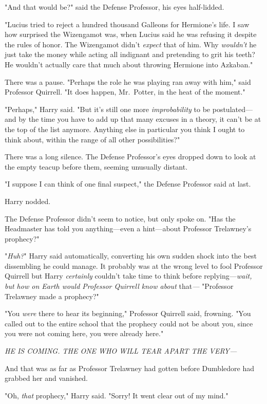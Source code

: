 "And that would be?" said the Defense Professor, his eyes half-lidded.

"Lucius tried to reject a hundred thousand Galleons for Hermione's life. I saw 
how surprised the Wizengamot was, when Lucius said he was refusing it despite 
the rules of honor. The Wizengamot didn't \emph{expect} that of him. Why 
\emph{wouldn't} he just take the money while acting all indignant and 
pretending to grit his teeth? He wouldn't actually care that much about 
throwing Hermione into Azkaban."

There was a pause. "Perhaps the role he was playing ran away with him," said 
Professor Quirrell. "It does happen, Mr.~Potter, in the heat of the moment."

"Perhaps," Harry said. "But it's still one more \emph{improbability} to be 
postulated---and by the time you have to add up that many excuses in a theory, 
it can't be at the top of the list anymore. Anything else in particular you 
think I ought to think about, within the range of all other possibilities?"

There was a long silence. The Defense Professor's eyes dropped down to look at 
the empty teacup before them, seeming unusually distant.

"I suppose I can think of one final suspect," the Defense Professor said at 
last.

Harry nodded.

The Defense Professor didn't seem to notice, but only spoke on. "Has the 
Headmaster has told you anything---even a hint---about Professor Trelawney's 
prophecy?"

"\emph{Huh?}" Harry said automatically, converting his own sudden shock into 
the best dissembling he could manage. It probably was at the wrong level to 
fool Professor Quirrell but Harry \emph{certainly} couldn't take time to think 
before replying---\emph{wait, but how on Earth would Professor Quirrell know 
about} that\emph{---} "Professor Trelawney made a prophecy?"

"You \emph{were} there to hear its beginning," Professor Quirrell said, 
frowning. "You called out to the entire school that the prophecy could not be 
about you, since you were not coming here, you were already here."

\emph{HE IS COMING. THE ONE WHO WILL TEAR APART THE VERY---}

And that was as far as Professor Trelawney had gotten before Dumbledore had 
grabbed her and vanished.

"Oh, \emph{that} prophecy," Harry said. "Sorry! It went clear out of my mind."

